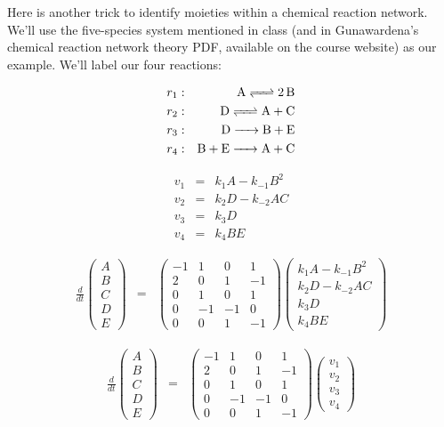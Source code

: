 \documentclass{article}
\begin{document}
\large

Here is another trick to identify moieties within a chemical reaction network. We'll use the five-species system mentioned in class (and in Gunawardena's chemical reaction network theory PDF, available on the course website) as our example. We'll  label our four reactions:

\begin{eqnarray*}
r_1: & &  \ce{A <=>  2B }\\
r_2: & &  \ce{D <=>  A + C }\\
r_3: & &  \ce{D ->  B + E }\\
r_4: & &  \ce{B + E ->  A + C }\\
\end{eqnarray*}

\begin{eqnarray*}
v_1 & = & k_1 A - k_{-1} B^2\\
v_2 & = & k_2 D - k_{-2} A C\\
v_3 & = & k_3 D\\
v_4 & = & k_4 B E
\end{eqnarray*}


\begin{eqnarray*}
\frac{d}{dt} \begin{pmatrix} A\\ B \\ C\\ D\\ E \end{pmatrix} & = & \begin{pmatrix} -1 & 1 & 0 & 1\\
2 & 0 & 1 & -1\\
0 & 1 & 0 & 1\\
0 & -1 & -1 & 0\\
0 & 0 & 1 & -1
\end{pmatrix} \begin{pmatrix} k_1 A - k_{-1} B^2 \\ k_2 D - k_{-2} A C  \\ k_3 D \\ k_4 B E \end{pmatrix}
\end{eqnarray*}


\begin{eqnarray*}
\frac{d}{dt} \begin{pmatrix} A\\ B \\ C\\ D\\ E \end{pmatrix} & = & \begin{pmatrix} -1 & 1 & 0 & 1\\
2 & 0 & 1 & -1\\
0 & 1 & 0 & 1\\
0 & -1 & -1 & 0\\
0 & 0 & 1 & -1
\end{pmatrix} \begin{pmatrix} v_1\\ v_2 \\ v_3 \\ v_4 \end{pmatrix}
\end{eqnarray*}
\end{document}
